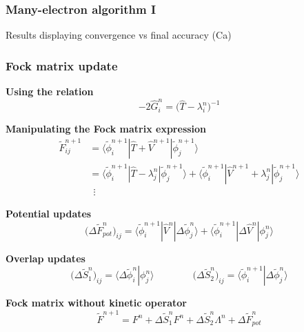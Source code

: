 \begin{frame}
    \frametitle{Many-electron algorithm I}
    Results displaying convergence vs final accuracy (Ca)
\end{frame}

\begin{frame}
    \frametitle{Fock matrix update}
    \centering
    \textbf{Using the relation}
    \begin{equation}
        \nonumber
        -2\hat{G}_i^n = \big(\hat{T} - \lambda_i^n\big)^{-1}
    \end{equation}

    \vspace{3mm}

    \textbf{Manipulating the Fock matrix expression}
    \begin{align}
        \nonumber
        \tilde{F}_{ij}^{n+1}    &= 
        \langle\tilde{\phi}_i^{n+1} |
        \hat{T} + \hat{V}^{n+1}     |
        \tilde{\phi}_j^{n+1}\rangle\\
        \nonumber
			    &= 
        \langle\tilde{\phi}_i^{n+1} |
        \hat{T} - \lambda_j^n       |
        \tilde{\phi}_j^{n+1}\rangle +
        \langle\tilde{\phi}_i^{n+1} |
        \hat{V}^{n+1} + \lambda_j^n |
        \tilde{\phi}_j^{n+1}\rangle\\
        \nonumber
        &\ \ \vdots
    \end{align}

    \textbf{Potential updates}
    \begin{equation}
        \nonumber
        \big(\Delta\tilde{F}_{pot}^n\big)_{ij} =
        \langle\tilde{\phi}_i^{n+1} |
        \hat{V}^n                       |
        \Delta\tilde{\phi}_j^n\rangle + 
        \langle\tilde{\phi}_i^{n+1} |
        \Delta\hat{V}^n                 |
        \phi_j^n\rangle
    \end{equation}

    \vspace{3mm}

    \textbf{Overlap updates}
    \begin{equation}
    \nonumber
        \big(\Delta\tilde{S}_1^n\big)_{ij} =
        \langle\Delta\tilde{\phi}_i^n | \phi_j^n\rangle \qquad \qquad
        \big(\Delta \tilde{S}_2^n\big)_{ij} =
        \langle\tilde{\phi}_i^{n+1} | \Delta\tilde{\phi}_j^n\rangle
    \end{equation}

    \vspace{3mm}

    \centering
    \textbf{Fock matrix without kinetic operator}
    \begin{equation}
        \nonumber
        \tilde{F}^{n+1} = F^{n} + 
        \Delta \tilde{S}_1^n F^n +
        \Delta \tilde{S}_2^n \Lambda^n +
        \Delta \tilde{F}_{pot}^n
    \end{equation}
\end{frame}

